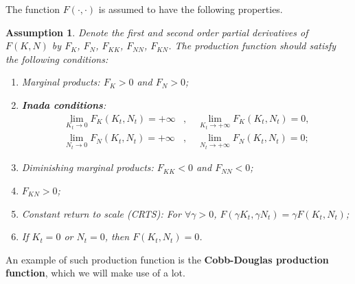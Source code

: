 \documentclass{book}
\theoremstyle{definition}
\theoremstyle{plain}
\newtheorem{assumption}{Assumption}[chapter]
\begin{document}
The function $F(\cdot, \cdot)$ is assumed to have the following properties.
\begin{assumption}\label{asp:prod_func}
    Denote the first and second order partial derivatives of $F(K,N)$ by $F_K$, $F_N$, $F_{KK}$, $F_{NN}$, $F_{KN}$. The production function should satisfy the following conditions:
    \begin{enumerate}[label=(\arabic*)]
        \item Marginal products: $F_K > 0$ and $F_N > 0$;
        \item \textbf{Inada conditions}: 
        \begin{align*}
            \lim_{K_t \to 0} F_K(K_t, N_t) = +\infty&, \quad 
            \lim_{K_t \to +\infty} F_K(K_t, N_t) = 0,\\
            \lim_{N_t \to 0} F_N(K_t, N_t) = +\infty&, \quad
            \lim_{N_t \to +\infty} F_N(K_t, N_t) = 0;
        \end{align*}
        \item Diminishing marginal products: $F_{KK} < 0$ and $F_{NN} < 0$;
        \item $F_{KN} > 0$;
        \item Constant return to scale (CRTS): For $\forall \gamma > 0$, $F(\gamma K_t, \gamma N_t) = \gamma F(K_t, N_t)$;
        \item If $K_t = 0$ or $N_t = 0$, then $F(K_t, N_t) = 0$.
    \end{enumerate}
\end{assumption}
An example of such production function is the \textbf{Cobb-Douglas production function}, which we will make use of a lot.
\end{document}
